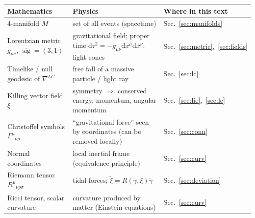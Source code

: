 \documentclass[11pt,a4paper]{article}
\numberwithin{equation}{section}
\theoremstyle{definition}
\theoremstyle{plain}
\newcommand{\dd}{\mathrm{d}}
\newcommand{\sig}{\operatorname{sig}}
\begin{document}
\begin{center}
\begin{tabular}{@{}p{4.1cm}p{5.1cm}p{5.2cm}@{}}
\toprule
\textbf{Mathematics} & \textbf{Physics} & \textbf{Where in this text}\\ \midrule
4-manifold $M$ & set of all events (spacetime) & Sec.~\ref{sec:manifolds}\\
Lorentzian metric $g_{\mu\nu}$, $\sig=(3,1)$ & gravitational field; proper time $\dd\tau^2=-g_{\mu\nu}\dd x^\mu\dd x^\nu$; light cones & Sec.~\ref{sec:metric},~\ref{sec:fields}\\
Timelike / null geodesic of $\nabla^{LC}$ & free fall of a massive particle / light ray & Sec.~\ref{sec:lc}\\
Killing vector field $\xi$ & symmetry $\Rightarrow$ conserved energy, momentum, angular momentum & Sec.~\ref{sec:lie},~\ref{sec:lc}\\
Christoffel symbols $\Gamma^\mu{}_{\nu\rho}$ & ``gravitational force'' seen by coordinates (can be removed locally) & Sec.~\ref{sec:conn}\\
Normal coordinates & local inertial frame (equivalence principle) & Sec.~\ref{sec:curv}\\
Riemann tensor $R^\mu{}_{\nu\rho\sigma}$ & tidal forces; $\ddot\xi=R(\dot\gamma,\xi)\dot\gamma$ & Sec.~\ref{sec:deviation}\\
Ricci tensor, scalar curvature & curvature produced by matter (Einstein equations) & Sec.~\ref{sec:curv}\\ \bottomrule
\end{tabular}
\end{center}
\end{document}
